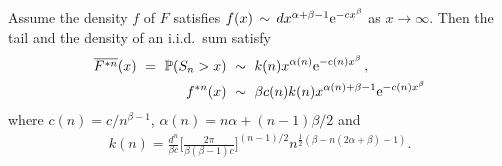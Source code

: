 \begin{corollary} \label{SACor4.2}
Assume the density $f$ of $F$ satisfies $f(x)\,\sim\, dx^{\alpha+\beta-1}\mathrm{e}^{-c x^\beta}$ as $x\to\infty$. Then the tail and the density of an i.i.d.\ sum satisfy
\begin{align}\label{SA4.2c}
\overline{F^{*n}}(x)\ =\ \operatorname{{\mathbb P}}(S_n>x)\ &\sim \ k(n) x^{\alpha(n)}\mathrm{e}^{-c(n) x^\beta}\,,
\\ \label{SA4.2d}  f^{*n}(x)\ &\sim\ \beta c(n) k(n) x^{\alpha(n)+\beta-1}\mathrm{e}^{-c(n) x^\beta}
\end{align}
where $c(n)=c/n^{\beta-1}$, $\alpha(n) = n\alpha+(n-1)\beta/2$ and
\begin{align}\label{SA4.2g}
k(n) = \frac{d^n}{\beta c} \Big[ \frac{2\pi}{\beta(\beta-1) c} \Big]^{(n-1)/2} n^{\frac{1}{2} (\beta -n (2 \alpha +\beta )-1)}.
\end{align}
\end{corollary}
